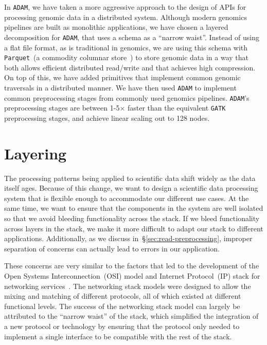 \documentclass[masters]{ucbthesis}
\begin{document}
In \texttt{ADAM}, we have taken a more aggressive approach to the design of APIs for processing genomic data
in a distributed system. Although modern genomics pipelines are built as monolithic applications, we have
chosen a layered decomposition for \texttt{ADAM}, that uses a schema as a ``narrow waist''. Instead of using
a flat file format, as is traditional in genomics, we are using this schema with \texttt{Parquet}~(a commodity columnar
store~\cite{parquet}) to store genomic data in a way that both allows efficient distributed read/write and that
achieves high compression. On top of this, we have added primitives that implement common genomic traversals
in a distributed manner. We have then used \texttt{ADAM} to implement common preprocessing stages from
commonly used genomics pipelines. \texttt{ADAM}'s preprocessing stages are between 1-5$\times$ faster than the
equivalent \texttt{GATK} preprocessing stages, and achieve linear scaling out to 128 nodes.

\section{Layering}
\label{sec:layering}

The processing patterns being applied to scientific data shift widely as the data itself ages. Because of
this change, we want to design a scientific data processing system that is flexible enough to
accommodate our different use cases. At the same time, we want to ensure that the components in the
system are well isolated so that we avoid bleeding functionality across the stack. If we bleed functionality
across layers in the stack, we make it more difficult to adapt our stack to different applications.
Additionally, as we discuss in~\S\ref{sec:read-preprocessing}, improper separation of concerns can
actually lead to errors in our application.

These concerns are very similar to the factors that led to the development of the Open Systems
Interconnection~(OSI) model and Internet Protocol~(IP) stack for networking
services~\cite{zimmermann80}. The networking stack models were designed to allow the mixing and
matching of different protocols, all of which existed at different functional levels. The success of the
networking stack model can largely be attributed to the ``narrow waist'' of the stack, which simplified the
integration of a new protocol or technology by ensuring that the protocol only needed to implement a
single interface to be compatible with the rest of the stack.
\end{document}
